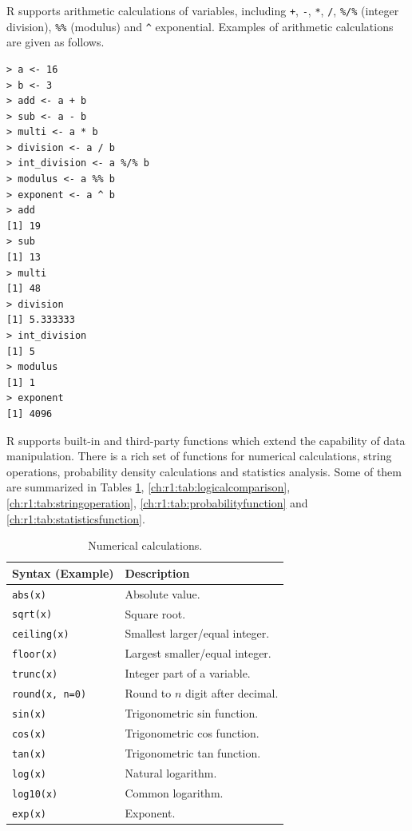 R supports arithmetic calculations of variables, including \verb|+|, \verb|-|, \verb|*|, \verb|/|, \verb|%/%| (integer division), \verb|%%| (modulus) and \verb|^| exponential. Examples of arithmetic calculations are given as follows.
\begin{lstlisting}
> a <- 16
> b <- 3
> add <- a + b
> sub <- a - b
> multi <- a * b
> division <- a / b
> int_division <- a %/% b
> modulus <- a %% b
> exponent <- a ^ b
> add
[1] 19
> sub
[1] 13
> multi
[1] 48
> division
[1] 5.333333
> int_division
[1] 5
> modulus
[1] 1
> exponent
[1] 4096
\end{lstlisting}

R supports built-in and third-party functions which extend the capability of data manipulation. There is a rich set of functions for numerical calculations, string operations, probability density calculations and statistics analysis. Some of them are summarized in Tables \ref{ch:r1:tab:numericalcalculation}, \ref{ch:r1:tab:logicalcomparison}, \ref{ch:r1:tab:stringoperation}, \ref{ch:r1:tab:probabilityfunction} and \ref{ch:r1:tab:statisticsfunction}.

\begin{table}
  \centering \caption{Numerical calculations.}\label{ch:r1:tab:numericalcalculation}
  \begin{tabularx}{\textwidth}{lX}
    \hline
    Syntax (Example) & Description \\ \hline
    \verb|abs(x)| & Absolute value. \\
    \verb|sqrt(x)| & Square root. \\
    \verb|ceiling(x)| & Smallest larger/equal integer. \\
    \verb|floor(x)| & Largest smaller/equal integer. \\
    \verb|trunc(x)| & Integer part of a variable. \\
    \verb|round(x, n=0)| & Round to $n$ digit after decimal. \\
    \verb|sin(x)| & Trigonometric sin function. \\
    \verb|cos(x)| & Trigonometric cos function. \\
    \verb|tan(x)| & Trigonometric tan function. \\
    \verb|log(x)| & Natural logarithm. \\
    \verb|log10(x)| & Common logarithm. \\
    \verb|exp(x)| & Exponent. \\
    \hline
  \end{tabularx}
\end{table}

